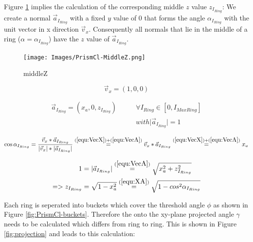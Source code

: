 \documentclass[../ClassicThesis.tex]{subfiles}
\begin{document}
Figure \ref{fig:middleZ} implies the calculation of the corresponding middle $z$ value $z_{I_{Ring}}$: We create a normal $\vec{a}_{I_{Ring}}$ with a fixed $y$ value of 0 that forms the angle ${\alpha}_{I_{Ring}}$ with the unit vector in x direction $\vec{v}_{x}$. Consequently all normals that lie in the middle of a ring ($\alpha = {\alpha}_{I_{Ring}}$) have the $z$ value of $\vec{a}_{I_{Ring}}$.

\begin{figure}
    \texttt{[image: Images/PrismCl-MiddleZ.png]}
    \caption{middleZ}
    \label{fig:middleZ}
\end{figure}

\begin{equation}
\label{equ:VecX}
    \vec{v}_{x} = (1, 0, 0)
\end{equation}

\begin{equation}
\begin{split}
    \label{equ:VecA}
    \vec{a}_{I_{Ring}} = (x_{a}, 0, z_{I_{Ring}}) \qquad  & \forall{ I_{Ring} \in [0, I_{MaxRing}] } \\
    & with \vert \vec{a}_{I_{Ring}} \vert = 1
\end{split}
\end{equation}

\begin{equation}
    \label{equ:XA}
    \cos{{\alpha}_{I_{Ring}}} = \frac{ \vec{v}_{x} * \vec{a}_{I_{Ring}} }{ \vert \vec{v}_{x} \vert * \vert \vec{a}_{I_{Ring}} \vert }
    \stackrel{(\ref{equ:VecX}) + (\ref{equ:VecA})}{=} \vec{v}_{x} * \vec{a}_{I_{Ring}}
    \stackrel{(\ref{equ:VecX}) + (\ref{equ:VecA})}{=} x_{a}
\end{equation}

\begin{equation}
\label{equ:ZIRing}
\begin{split}
    1 & = \vert \vec{a}_{I_{Ring}} \vert \stackrel{(\ref{equ:VecA})}{=} \sqrt{ x_{a}^{2} + z_{I_{Ring}}^{2} } \\
    => z_{I_{Ring}} & = \sqrt{1 - x_{a}^{2}} 
    \stackrel{(\ref{equ:XA})}{=} \sqrt{1 - cos^{2}{{\alpha}_{I_{Ring}}}}
\end{split}
\end{equation}


Each ring is seperated into buckets which cover the threshold angle $\phi$ as shown in Figure \ref{fig:PrismCl-buckets}. Therefore the onto the xy-plane projected angle $\gamma$ needs to be calculated which differs from ring to ring. This is shown in Figure \ref{fig:projection} and leads to this calculation:
\end{document}
